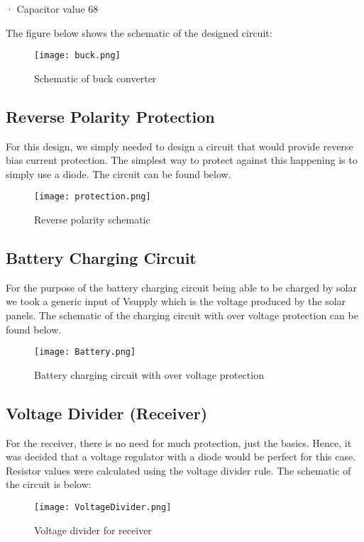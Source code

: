 \documentclass[class=report,11pt,crop=false]{standalone}
\begin{document}
· Capacitor value 68 

The figure below shows the schematic of the designed circuit:
\begin{figure}
    \centering
    \texttt{[image: buck.png]}
    \caption{Schematic of buck converter}
\end{figure}

\subsection{Reverse Polarity Protection}

For this design, we simply needed to design a circuit that would provide reverse bias current protection. The simplest way to protect against this happening is to simply use a diode. The circuit can be found below.
\begin{figure}
    \centering
    \texttt{[image: protection.png]}
    \caption{Reverse polarity schematic}
    \label{fig:enter-label}
\end{figure}

\subsection{Battery Charging Circuit}

For the purpose of the battery charging circuit being able to be charged by solar we took a generic input of Vsupply which is the voltage produced by the solar panels. The schematic of the charging circuit with over voltage protection can be found below.
\begin{figure}
    \centering
    \texttt{[image: Battery.png]}
    \caption{Battery charging circuit with over voltage protection}
    \label{fig:enter-label}
\end{figure}

\subsection{Voltage Divider (Receiver)}

For the receiver, there is no need for much protection, just the basics. Hence, it was decided that a voltage regulator with a diode would be perfect for this case. Resistor values were calculated using the voltage divider rule. The schematic of the circuit is below:
\begin{figure}
    \centering
    \texttt{[image: VoltageDivider.png]}
    \caption{Voltage divider for receiver}
    \label{fig:enter-label}
\end{figure}
\end{document}
